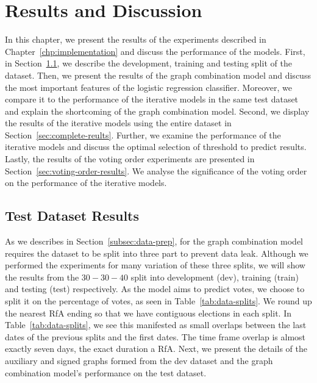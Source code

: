 \chapter{Results and Discussion} 
\label{chp:results}
In this chapter, we present the results of the experiments described in Chapter~\ref{chp:implementation} and discuss the performance of the models.
First, in Section~\ref{sec:test-data-results}, we describe the development, training and testing split of the dataset.
Then, we present the results of the graph combination model and discuss the most important features of the logistic regression classifier.
Moreover, we compare it to the performance of the iterative models in the same test dataset and explain the shortcoming of the graph combination model.
Second, we display the results of the iterative models using the entire \wikirfa dataset in Section~\ref{sec:complete-reults}.
Further, we examine the performance of the iterative models and discuss the optimal selection of threshold to predict results.
Lastly, the results of the voting order experiments are presented in Section~\ref{sec:voting-order-results}.
We analyse the significance of the voting order on the performance of the iterative models.


\section{Test Dataset Results}
\label{sec:test-data-results}
As we describes in Section~\ref{subsec:data-prep}, for the graph combination model requires the \wikirfa dataset to be split into three part to prevent data leak.
Although we performed the experiments for many variation of these three splits, we will show the results from the $30-30-40$ split into development (dev), training (train) and testing (test) respectively.
As the model aims to predict votes, we choose to split it on the percentage of votes, as seen in Table~\ref{tab:data-splits}.
We round up the nearest RfA ending so that we have contiguous elections in each split.
In Table~\ref{tab:data-splits}, we see this manifested as small overlaps between the last dates of the previous splits and the first dates.
The time frame overlap is almost exactly seven days, the exact duration a RfA.
Next, we present the details of the auxiliary and signed graphs formed from the dev dataset and the graph combination model's performance on the test dataset.

